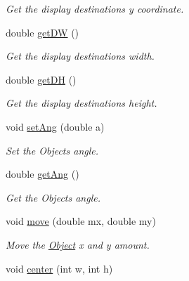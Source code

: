 \begin{DoxyCompactItemize}
\begin{DoxyCompactList}\small\item\em Get the display destinations y coordinate. \end{DoxyCompactList}\item 
double \hyperlink{classObject_aa02be608cc4043a38675b93d69f5b42f}{get\+DW} ()\hypertarget{classObject_aa02be608cc4043a38675b93d69f5b42f}{}\label{classObject_aa02be608cc4043a38675b93d69f5b42f}

\begin{DoxyCompactList}\small\item\em Get the display destinations width. \end{DoxyCompactList}\item 
double \hyperlink{classObject_a9bb26c1b30e1a77a6ae4de340c4ab2f4}{get\+DH} ()\hypertarget{classObject_a9bb26c1b30e1a77a6ae4de340c4ab2f4}{}\label{classObject_a9bb26c1b30e1a77a6ae4de340c4ab2f4}

\begin{DoxyCompactList}\small\item\em Get the display destinations height. \end{DoxyCompactList}\item 
void \hyperlink{classObject_a660b00ecff522cd7dfef7b0f736456e6}{set\+Ang} (double a)\hypertarget{classObject_a660b00ecff522cd7dfef7b0f736456e6}{}\label{classObject_a660b00ecff522cd7dfef7b0f736456e6}

\begin{DoxyCompactList}\small\item\em Set the Objects angle. \end{DoxyCompactList}\item 
double \hyperlink{classObject_a9d6545d0250767ddb6e9d4c6fbf41d4b}{get\+Ang} ()\hypertarget{classObject_a9d6545d0250767ddb6e9d4c6fbf41d4b}{}\label{classObject_a9d6545d0250767ddb6e9d4c6fbf41d4b}

\begin{DoxyCompactList}\small\item\em Get the Objects angle. \end{DoxyCompactList}\item 
void \hyperlink{classObject_a31ef66bafcc755414112789c9231a8be}{move} (double mx, double my)\hypertarget{classObject_a31ef66bafcc755414112789c9231a8be}{}\label{classObject_a31ef66bafcc755414112789c9231a8be}

\begin{DoxyCompactList}\small\item\em Move the \hyperlink{classObject}{Object} x and y amount. \end{DoxyCompactList}\item 
void \hyperlink{classObject_a95af63b61c22ac2a8117742b9fa0efb5}{center} (int w, int h)\hypertarget{classObject_a95af63b61c22ac2a8117742b9fa0efb5}{}\label{classObject_a95af63b61c22ac2a8117742b9fa0efb5}


\end{DoxyCompactItemize}
